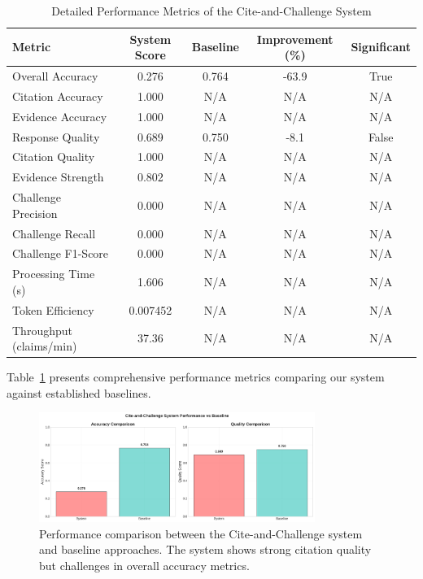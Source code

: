 \documentclass[11pt,a4paper]{article}
\begin{document}
\begin{table}[htbp]
\centering
\caption{Detailed Performance Metrics of the Cite-and-Challenge System}
\label{tab:detailed_metrics}
\begin{tabular}{|l|c|c|c|c|}
\hline
\textbf{Metric} & \textbf{System Score} & \textbf{Baseline} & \textbf{Improvement (\%)} & \textbf{Significant} \\
\hline
Overall Accuracy & 0.276 & 0.764 & -63.9 & True \\
Citation Accuracy & 1.000 & N/A & N/A & N/A \\
Evidence Accuracy & 1.000 & N/A & N/A & N/A \\
Response Quality & 0.689 & 0.750 & -8.1 & False \\
Citation Quality & 1.000 & N/A & N/A & N/A \\
Evidence Strength & 0.802 & N/A & N/A & N/A \\
Challenge Precision & 0.000 & N/A & N/A & N/A \\
Challenge Recall & 0.000 & N/A & N/A & N/A \\
Challenge F1-Score & 0.000 & N/A & N/A & N/A \\
Processing Time (s) & 1.606 & N/A & N/A & N/A \\
Token Efficiency & 0.007452 & N/A & N/A & N/A \\
Throughput (claims/min) & 37.36 & N/A & N/A & N/A \\
\hline
\end{tabular}
\end{table}

Table~\ref{tab:detailed_metrics} presents comprehensive performance metrics comparing our system against established baselines.

\begin{figure}[htbp]
\centering
\includegraphics[width=0.8\textwidth]{figures/performance_comparison.png}
\caption{Performance comparison between the Cite-and-Challenge system and baseline approaches. The system shows strong citation quality but challenges in overall accuracy metrics.}
\label{fig:performance_comparison}
\end{figure}
\end{document}
